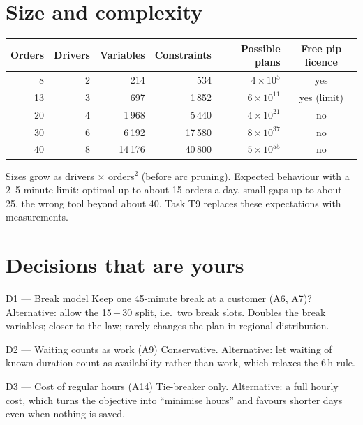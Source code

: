 \documentclass[11pt,a4paper]{article}
\begin{document}
\section{Size and complexity}

\begin{center}\small
\begin{tabular}{@{}rrrrrc@{}}
\toprule
\textbf{Orders} & \textbf{Drivers} & \textbf{Variables} & \textbf{Constraints} & \textbf{Possible plans} & \textbf{Free pip licence} \\
\midrule
8 & 2 & 214 & 534 & $4\times10^{5}$ & yes \\
13 & 3 & 697 & 1\,852 & $6\times10^{11}$ & yes (limit) \\
20 & 4 & 1\,968 & 5\,440 & $4\times10^{21}$ & no \\
30 & 6 & 6\,192 & 17\,580 & $8\times10^{37}$ & no \\
40 & 8 & 14\,176 & 40\,800 & $5\times10^{55}$ & no \\
\bottomrule
\end{tabular}
\end{center}

Sizes grow as drivers $\times$ orders$^2$ (before arc pruning). Expected behaviour with a 2--5 minute limit: optimal up to about 15 orders a day, small gaps up to about 25, the wrong tool beyond about 40. Task T9 replaces these expectations with measurements.

\section{Decisions that are yours}

\begin{decide}{D1 --- Break model}
Keep one 45-minute break at a customer (A6, A7)? Alternative: allow the 15\,+\,30 split, i.e.\ two break slots. Doubles the break variables; closer to the law; rarely changes the plan in regional distribution.
\end{decide}

\begin{decide}{D2 --- Waiting counts as work (A9)}
Conservative. Alternative: let waiting of known duration count as availability rather than work, which relaxes the 6\,h rule.
\end{decide}

\begin{decide}{D3 --- Cost of regular hours (A14)}
Tie-breaker only. Alternative: a full hourly cost, which turns the objective into ``minimise hours'' and favours shorter days even when nothing is saved.
\end{decide}
\end{document}
